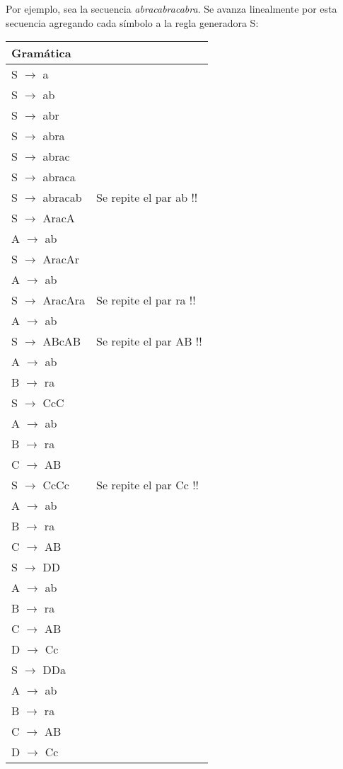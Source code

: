Por ejemplo, sea la secuencia \textit{abracabracabra}. Se avanza linealmente por esta secuencia agregando cada símbolo a la regla generadora S:

\begin{minipage}[t]{0.5\textwidth}
\centering
\begin{tabular}{|l|l|}
\hline
Gramática &  \\
\hline
S $\rightarrow$ a &  \\
\hline
S $\rightarrow$ ab &\\
\hline
S $\rightarrow$ abr &\\
\hline
S $\rightarrow$ abra &\\
\hline
S $\rightarrow$ abrac &\\
\hline
S $\rightarrow$ abraca &\\
\hline
S $\rightarrow$ abracab & Se repite el par ab !! \\
\hline
S $\rightarrow$ AracA  & \\
A $\rightarrow$ ab & \\
\hline
S $\rightarrow$ AracAr  & \\
A $\rightarrow$ ab & \\
\hline
S $\rightarrow$ AracAra  & Se repite el par ra !! \\
A $\rightarrow$ ab & \\
\hline
S $\rightarrow$ ABcAB  & Se repite el par AB !! \\
A $\rightarrow$ ab & \\
B $\rightarrow$ ra & \\
\hline
S $\rightarrow$ CcC  &  \\
A $\rightarrow$ ab & \\
B $\rightarrow$ ra & \\
C $\rightarrow$ AB & \\
\hline
S $\rightarrow$ CcCc  & Se repite el par Cc !! \\ 
A $\rightarrow$ ab & \\
B $\rightarrow$ ra & \\
C $\rightarrow$ AB & \\
\hline
S $\rightarrow$ DD  & \\ 
A $\rightarrow$ ab & \\
B $\rightarrow$ ra & \\
C $\rightarrow$ AB & \\
D $\rightarrow$ Cc & \\
\hline
S $\rightarrow$ DDa  & \\ 
A $\rightarrow$ ab & \\
B $\rightarrow$ ra & \\
C $\rightarrow$ AB & \\
D $\rightarrow$ Cc & \\
\hline
\end{tabular}

\end{minipage}%
